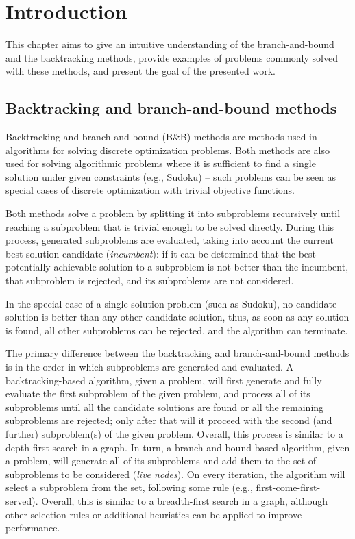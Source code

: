 \chapter{Introduction}
\label{chap:intro}

This chapter aims to give an intuitive understanding of the branch-and-bound and
the backtracking methods, provide examples of problems commonly solved with these methods,
and present the goal of the presented work.

\section{Backtracking and branch-and-bound methods}

Backtracking and branch-and-bound (B\&B) methods are methods used in
algorithms for solving discrete optimization problems. Both methods are also used for solving
algorithmic problems where it is sufficient to find a single solution under given constraints
(e.g., Sudoku) -- such problems can be seen as special cases of discrete optimization with
trivial objective functions.

Both methods solve a problem by splitting it into subproblems recursively until reaching a
subproblem that is trivial enough to be solved directly. During this process, generated
subproblems are evaluated, taking into account the current best solution
candidate (\emph{incumbent}): if it can be determined that the best potentially
achievable solution to a subproblem is not better than the incumbent, that subproblem is
rejected, and its subproblems are not considered.

In the special case of a single-solution problem (such as Sudoku), no candidate solution
is better than any other candidate solution, thus, as soon as any solution is found,
all other subproblems can be rejected, and the algorithm can terminate.

The primary difference between the backtracking and branch-and-bound methods
is in the order in which subproblems are generated and evaluated. A backtracking-based
algorithm, given a problem, will first generate and fully evaluate the first subproblem
of the given problem, and process all of its subproblems until all the candidate solutions
are found or all the remaining subproblems are rejected; only after that will it proceed with
the second (and further) subproblem(s) of the given problem. Overall, this process is similar to
a depth-first search in a graph. In turn, a branch-and-bound-based algorithm, given a problem,
will generate all of its subproblems and add them to the set of subproblems to be considered
(\emph{live nodes}). On every iteration, the algorithm will select a subproblem from the set,
following some rule (e.g., first-come-first-served). Overall, this is similar to a breadth-first
search in a graph, although other selection rules or additional heuristics can be applied to
improve performance.

